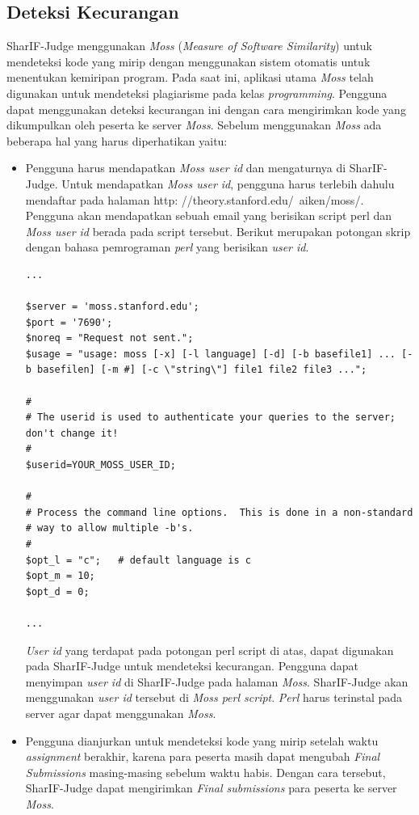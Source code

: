 \subsection{Deteksi Kecurangan}
\label{sec: Deteksi Kecurangan}
SharIF-Judge menggunakan \textit{Moss} (\textit{Measure of Software Similarity}) untuk mendeteksi kode yang mirip dengan menggunakan sistem otomatis untuk menentukan kemiripan program. Pada saat ini, aplikasi utama \textit{Moss} telah digunakan untuk mendeteksi plagiarisme pada kelas \textit{programming}. Pengguna dapat menggunakan deteksi kecurangan ini dengan cara mengirimkan kode yang dikumpulkan oleh peserta ke server \textit{Moss}. 
Sebelum menggunakan \textit{Moss} ada beberapa hal yang harus diperhatikan yaitu:
\begin{itemize}
    \item Pengguna harus mendapatkan \textit{Moss user id} dan mengaturnya di SharIF-Judge. Untuk mendapatkan \textit{Moss user id}, pengguna harus terlebih dahulu mendaftar pada halaman http:
//theory.stanford.edu/~aiken/moss/. Pengguna akan mendapatkan sebuah email yang berisikan script perl dan \textit{Moss user id} berada pada script tersebut. Berikut merupakan potongan skrip dengan bahasa pemrograman \textit{perl} yang berisikan \textit{user id}.

 \begin{lstlisting}[basicstyle=\ttfamily, frame=single,
    columns=fullflexible, breaklines=true, numbers=none]
...

$server = 'moss.stanford.edu';
$port = '7690';
$noreq = "Request not sent.";
$usage = "usage: moss [-x] [-l language] [-d] [-b basefile1] ... [-b basefilen] [-m #] [-c \"string\"] file1 file2 file3 ...";

#
# The userid is used to authenticate your queries to the server; don't change it!
#
$userid=YOUR_MOSS_USER_ID;

#
# Process the command line options.  This is done in a non-standard
# way to allow multiple -b's.
#
$opt_l = "c";   # default language is c
$opt_m = 10;
$opt_d = 0;

...
    \end{lstlisting}
\textit{User id} yang terdapat pada potongan perl script di atas, dapat digunakan pada SharIF-Judge untuk mendeteksi kecurangan. Pengguna dapat menyimpan \textit{user id} di SharIF-Judge pada halaman \textit{Moss}. SharIF-Judge akan menggunakan \textit{user id} tersebut di \textit{Moss perl script}. \textit{Perl} harus terinstal pada server agar dapat menggunakan \textit{Moss}.
    \item Pengguna dianjurkan untuk mendeteksi kode yang mirip setelah waktu \textit{assignment} berakhir, karena para peserta masih dapat mengubah \textit{Final Submissions} masing-masing sebelum waktu
    habis. Dengan cara tersebut, SharIF-Judge dapat mengirimkan \textit{Final submissions} para peserta ke server \textit{Moss}. 
\end{itemize}

